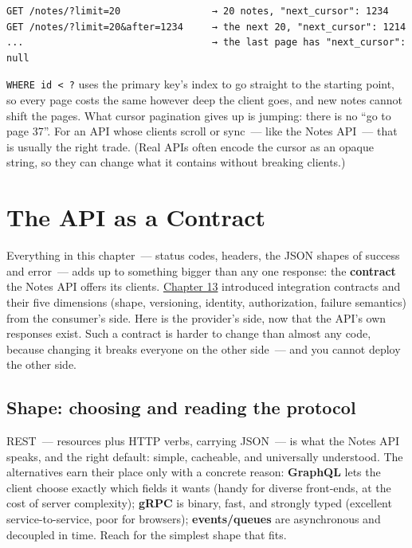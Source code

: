 \begin{outputbox}[short]
\begin{Verbatim}[fontsize=\codesize, breaklines, breakanywhere, breaksymbolleft={\tiny\textcolor{muted}{$\hookrightarrow$}}]
GET /notes/?limit=20                → 20 notes, "next_cursor": 1234
GET /notes/?limit=20&after=1234     → the next 20, "next_cursor": 1214
...                                 → the last page has "next_cursor": null
\end{Verbatim}
\end{outputbox}

\noindent{}\texttt{WHERE\ id\ \textless{}\ ?} uses the primary key's index to go straight to the starting point, so every page costs the same however deep the client goes, and new notes cannot shift the pages. What cursor pagination gives up is jumping: there is no ``go to page 37''. For an API whose clients scroll or sync~--- like the Notes API~--- that is usually the right trade. (Real APIs often encode the cursor as an opaque string, so they can change what it contains without breaking clients.)

\setcounter{section}{9}
\section{The API as a Contract}\label{34-response-handling:3410-the-api-as-a-contract}

Everything in this chapter~--- status codes, headers, the JSON shapes of success and error~--- adds up to something bigger than any one response: the \textbf{contract} the Notes API offers its clients. \hyperref[ch:13-configuration-externalization]{Chapter 13} introduced integration contracts and their five dimensions (shape, versioning, identity, authorization, failure semantics) from the consumer's side. Here is the provider's side, now that the API's own responses exist. Such a contract is harder to change than almost any code, because changing it breaks everyone on the other side~--- and you cannot deploy the other side.

\subsection*{Shape: choosing and reading the protocol}\label{34-response-handling:shape-choosing-and-reading-the-protocol}

REST~--- resources plus HTTP verbs, carrying JSON~--- is what the Notes API speaks, and the right default: simple, cacheable, and universally understood. The alternatives earn their place only with a concrete reason: \textbf{GraphQL} lets the client choose exactly which fields it wants (handy for diverse front-ends, at the cost of server complexity); \textbf{gRPC} is binary, fast, and strongly typed (excellent service-to-service, poor for browsers); \textbf{events/queues} are asynchronous and decoupled in time. Reach for the simplest shape that fits.

